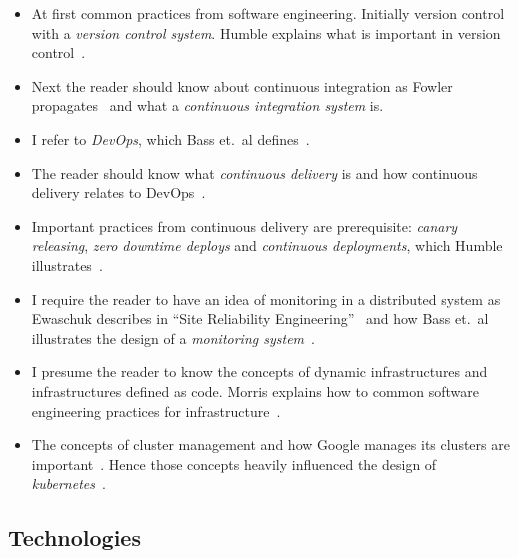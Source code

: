 \begin{itemize}

\item At first common practices from software engineering. Initially
  version control with a \emph{version control system}. Humble explains what is important in
  version control~\cite{cd_humble_config}.

\item Next the reader should know about continuous integration as Fowler
  propagates~\cite{ci_fowler} and what a \emph{continuous
    integration system} is.

\item I refer to \emph{DevOps}, which Bass et.~al defines~\cite{devops_definition}.

\item The reader should know what \emph{continuous delivery} is and how continuous
  delivery relates to DevOps~\cite{cd_wolff_devops}.

\item Important practices from continuous delivery are prerequisite: \emph{canary
    releasing}, \emph{zero downtime deploys} and \emph{continuous deployments}, which
  Humble illustrates~\cite{cd_humble_deploy}.

\item I require the reader to have an idea of monitoring in a distributed system as
  Ewaschuk describes in ``Site Reliability Engineering''~\cite{sre_monitoring} and how
  Bass et.~al illustrates the design of a \emph{monitoring
    system}~\cite{devops_monitoring}.

\item I presume the reader to know the concepts of dynamic infrastructures and
  infrastructures defined as code\cite{infra_as_code_platforms}. Morris explains how to
  common software engineering practices for
  infrastructure~\cite{infra_as_code_se_practices}.

\item The concepts of cluster management and how Google manages its clusters are
  important~\cite{borg}. Hence those concepts heavily influenced the design of
  \emph{kubernetes}~\cite{borg_kubernetes}.

\end{itemize}

\subsection{Technologies}

